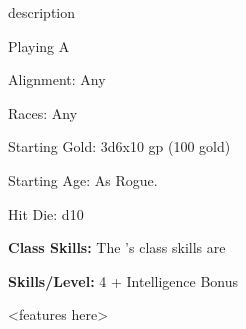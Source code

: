 
\currentclassname{} description

Playing A \currentclassname{}

Alignment: Any

Races: Any

Starting Gold: 3d6x10 gp (100 gold)

Starting Age: As Rogue.

Hit Die: d10

\textbf{Class Skills:} The \currentclassname{}'s class skills are 

\textbf{Skills/Level:} 4 + Intelligence Bonus

\goodbab{}
\goodfor{}
\goodref{}
\goodwil{}

\begin{classtable}
\levelone{}
\leveltwo{}
\levelthree{}
\levelfour{}
\levelfive{}
\levelsix{}
\levelseven{}
\leveleight{}
\levelnine{}
\levelten{}
\leveleleven{}
\leveltwelve{}
\levelthirteen{}
\levelfourteen{}
\levelfifteen{}
\levelsixteen{}
\levelseventeen{}
\leveleighteen{}
\levelnineteen{}
\leveltwenty{}
\end{classtable}

\classfeatures{}

<features here>